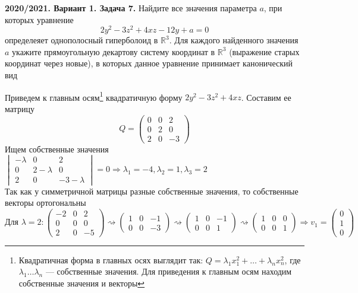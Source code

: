 \documentclass[a4paper]{article}
\begin{document}
\begin{tcolorbox}[colback=blue!20!white, colframe=black!100!black]
    \textbf{2020/2021. Вариант 1. Задача 7.} Найдите все значения параметра $a$, при которых уравнение $$2y^2-3z^2+4xz-12y+a=0$$ определеяет однополосный гиперболоид в $\mathbb{R}^3$. Для каждого найденного значения $a$ укажите прямоугольную декартову систему координат в $\mathbb{R}^3$ (выражение старых координат через новые), в которых данное уравнение принимает канонический вид
\end{tcolorbox}
\indent Приведем к главным осям\footnote{Квадратичная форма в главных осях выглядит так: $Q=\lambda_1x_1^2+\ldots+\lambda_nx_n^2$, где $\lambda_1\ldots\lambda_n$ — собственные значения. Для приведения к главным осям находим собственные значения и векторы} квадратичную форму $2y^2-3z^2+4xz$. Составим ее матрицу
$$Q=\begin{pmatrix}
    0&0&2\\
    0&2&0\\
    2&0&-3
\end{pmatrix}$$
Ищем собственные значения\\[2mm]
$\begin{vmatrix}
    -\lambda&0&2\\
    0&2-\lambda&0\\
    2&0&-3-\lambda
\end{vmatrix}=0\Longrightarrow \lambda_1=-4, \lambda_2=1, \lambda_3=2$\\[2mm]
Так как у симметричной матрицы разные собственные значения, то собственные векторы ортогональны\\[2mm]
$\boxed{\text{Для }\lambda=2:}\begin{pmatrix}
    -2&0&2\\
    0&0&0\\
    2&0&-5
\end{pmatrix}\rightsquigarrow\begin{pmatrix}
    1&0&-1\\
    0&0&-3
\end{pmatrix}\rightsquigarrow\begin{pmatrix}
    1&0&-1\\
    0&0&1
\end{pmatrix}\rightsquigarrow\begin{pmatrix}
    1&0&0\\
    0&0&1
\end{pmatrix}\Longrightarrow v_1=\begin{pmatrix}
    0\\
    1\\
    0
\end{pmatrix}$\\[2mm]
\end{document}
